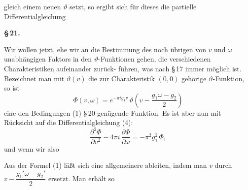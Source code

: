 gleich einem neuen $\vartheta$ setzt, so ergibt sich f\"ur dieses die partielle
Differentialgleichung



\begin{center}
\textbf{\S\,21.\quad{}}

\textbf{}
\end{center}

Wir wollen jetzt, ehe wir an die Bestimmung des noch
\"ubrigen von $v$ und $\omega$ unabh\"angigen Faktors in den $\vartheta$-Funktionen
gehen, die verschiedenen Charakteristiken aufeinander zur\"uck-
f\"uhren, was nach \S\,17 immer m\"oglich ist. Bezeichnet man mit
$\vartheta(v)$ die zur Charakteristik $(0, 0)$ geh\"orige $\vartheta$-Funktion, so ist
\[
\Phi(v,\omega) = e^{-\pi i g_1 v}\, \vartheta\!\left(v - \frac{g_1\omega - g_2}{2}\right)
\]
eine den Bedingungen (1) \S\,20 gen\"ugende Funktion. Es ist aber
nun mit R\"ucksicht auf die Differentialgleichung (4):
\[
\frac{\partial^2 \Phi}{\partial v^2} - 4\pi i\,\frac{\partial \Phi}{\partial \omega} = -\pi^2 g_1^2\,\Phi,
\]
und wenn wir also



Aus der Formel (1) l\"a\ss t sich eine allgemeinere ableiten,
indem man $v$ durch $v - \dfrac{g_1'\omega - g_2'}{2}$ ersetzt. Man erh\"alt so

